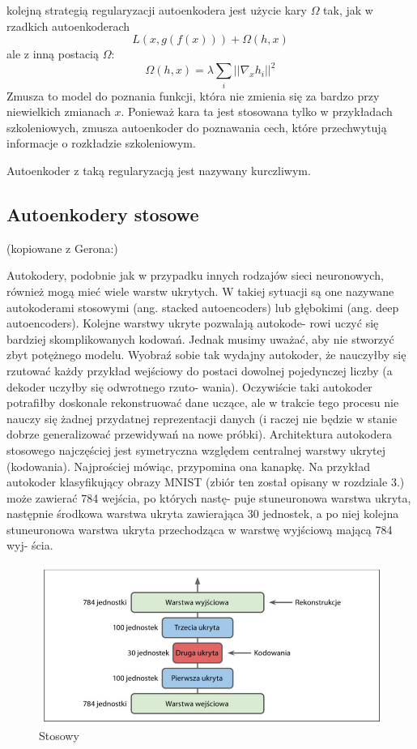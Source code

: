 \documentclass[12pt]{mwbk}
\theoremstyle{plain}
\theoremstyle{definition}
\theoremstyle{remark}
\newcommand\zrodlo[1]{\par\vspace{-3mm}{\small\textit{Źródło: }#1 }}
\begin{document}
kolejną strategią regularyzacji autoenkodera jest użycie kary $\Omega$ tak, jak w rzadkich autoenkoderach
$$L(x, g(f(x)))+\Omega(h,x)$$
ale z inną postacią $\Omega$:
$$\Omega(h, x)=\lambda \sum_i ||\nabla_x h_i ||^2$$
Zmusza to model do poznania funkcji, która nie zmienia się za bardzo przy niewielkich zmianach $x$. Ponieważ kara ta jest stosowana tylko w przykładach szkoleniowych, zmusza autoenkoder do poznawania cech, które przechwytują informacje o rozkładzie szkoleniowym.

Autoenkoder z taką regularyzacją jest nazywany kurczliwym.
\subsection{Autoenkodery stosowe}

(kopiowane z Gerona:)

Autokodery, podobnie jak w przypadku innych rodzajów sieci neuronowych, również mogą mieć
wiele warstw ukrytych. W takiej sytuacji są one nazywane autokoderami stosowymi (ang. stacked
autoencoders) lub głębokimi (ang. deep autoencoders). Kolejne warstwy ukryte pozwalają autokode-
rowi uczyć się bardziej skomplikowanych kodowań. Jednak musimy uważać, aby nie stworzyć
zbyt potężnego modelu. Wyobraź sobie tak wydajny autokoder, że nauczyłby się rzutować każdy
przykład wejściowy do postaci dowolnej pojedynczej liczby (a dekoder uczyłby się odwrotnego rzuto-
wania). Oczywiście taki autokoder potrafiłby doskonale rekonstruować dane uczące, ale w trakcie
tego procesu nie nauczy się żadnej przydatnej reprezentacji danych (i raczej nie będzie w stanie dobrze
generalizować przewidywań na nowe próbki).
Architektura autokodera stosowego najczęściej jest symetryczna względem centralnej warstwy ukrytej
(kodowania). Najprościej mówiąc, przypomina ona kanapkę. Na przykład autokoder klasyfikujący
obrazy MNIST (zbiór ten został opisany w rozdziale 3.) może zawierać 784 wejścia, po których nastę-
puje stuneuronowa warstwa ukryta, następnie środkowa warstwa ukryta zawierająca 30 jednostek,
a po niej kolejna stuneuronowa warstwa ukryta przechodząca w warstwę wyjściową mającą 784 wyj-
ścia.


\begin{figure}[!h]
	\centering
	\includegraphics[width=\linewidth]{rys/autoenkoder_stosowy.png}
	\caption{Stosowy}
	\zrodlo{\cite{geron}}
	\label{fig:autoenkoder-stosowy}
\end{figure}
\end{document}
